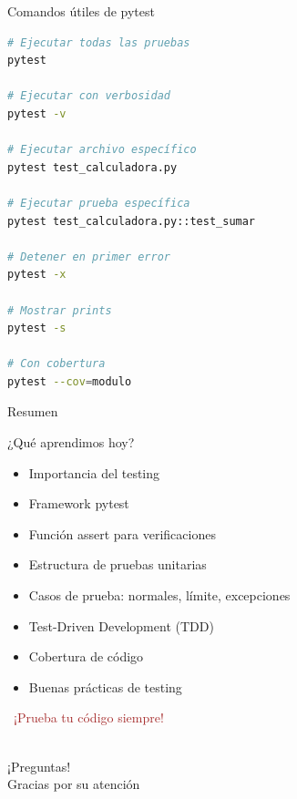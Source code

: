\documentclass{beamer}
\begin{document}
\begin{frame}[fragile]{Comandos útiles de pytest \faTerminal}
\begin{lstlisting}[language=bash, numbers=none]
# Ejecutar todas las pruebas
pytest

# Ejecutar con verbosidad
pytest -v

# Ejecutar archivo específico
pytest test_calculadora.py

# Ejecutar prueba específica
pytest test_calculadora.py::test_sumar

# Detener en primer error
pytest -x

# Mostrar prints
pytest -s

# Con cobertura
pytest --cov=modulo
\end{lstlisting}
\end{frame}

\begin{frame}{Resumen \faListUl}
\begin{conceptbox}{¿Qué aprendimos hoy?}
\small
\begin{itemize}
    \item[\faCheck] Importancia del testing
    \item[\faCheck] Framework pytest
    \item[\faCheck] Función assert para verificaciones
    \item[\faCheck] Estructura de pruebas unitarias
    \item[\faCheck] Casos de prueba: normales, límite, excepciones
    \item[\faCheck] Test-Driven Development (TDD)
    \item[\faCheck] Cobertura de código
    \item[\faCheck] Buenas prácticas de testing
\end{itemize}
\end{conceptbox}

\vspace{0.3cm}
\begin{center}
\large\textcolor{brown}{\faVial\ ¡Prueba tu código siempre!}
\end{center}
\end{frame}

\begin{frame}
\begin{center}
\Huge\textcolor{brown}{\faQuestionCircle}\\
\vspace{0.5cm}
\Huge ¡Preguntas!\\
\vspace{1cm}
\Large\textcolor{brownbright}{Gracias por su atención}
\end{center}
\end{frame}
\end{document}
